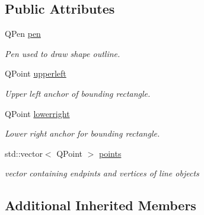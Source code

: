 \subsection*{Public Attributes}
\begin{DoxyCompactItemize}
\item 
\hypertarget{classShape1D_add0a527e431b0d5a216b600a2c60903a}{Q\-Pen \hyperlink{classShape1D_add0a527e431b0d5a216b600a2c60903a}{pen}}\label{classShape1D_add0a527e431b0d5a216b600a2c60903a}

\begin{DoxyCompactList}\small\item\em Pen used to draw shape outline. \end{DoxyCompactList}\item 
\hypertarget{classShape1D_a2a00297b7ebd6dcd64beb0474e6cd42d}{Q\-Point \hyperlink{classShape1D_a2a00297b7ebd6dcd64beb0474e6cd42d}{upperleft}}\label{classShape1D_a2a00297b7ebd6dcd64beb0474e6cd42d}

\begin{DoxyCompactList}\small\item\em Upper left anchor of bounding rectangle. \end{DoxyCompactList}\item 
\hypertarget{classShape1D_a5783a298129c1797b89c38fba3ab1888}{Q\-Point \hyperlink{classShape1D_a5783a298129c1797b89c38fba3ab1888}{lowerright}}\label{classShape1D_a5783a298129c1797b89c38fba3ab1888}

\begin{DoxyCompactList}\small\item\em Lower right anchor for bounding rectangle. \end{DoxyCompactList}\item 
\hypertarget{classShape1D_a5cafd442acdfe031e4fd9db08a119e23}{std\-::vector$<$ Q\-Point $>$ \hyperlink{classShape1D_a5cafd442acdfe031e4fd9db08a119e23}{points}}\label{classShape1D_a5cafd442acdfe031e4fd9db08a119e23}

\begin{DoxyCompactList}\small\item\em vector containing endpints and vertices of line objects \end{DoxyCompactList}\end{DoxyCompactItemize}
\subsection*{Additional Inherited Members}



